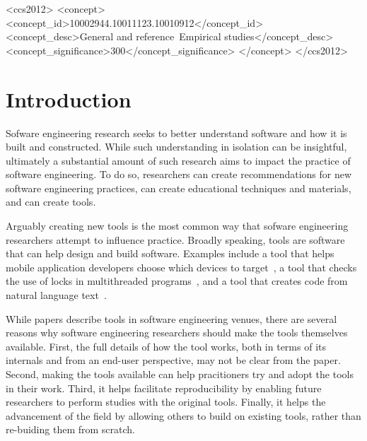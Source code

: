 \documentclass{sig-alternate-05-2015}
\begin{document}
%
\begin{CCSXML}
<ccs2012>
<concept>
<concept_id>10002944.10011123.10010912</concept_id>
<concept_desc>General and reference~Empirical studies</concept_desc>
<concept_significance>300</concept_significance>
</concept>
</ccs2012>
\end{CCSXML}


\printccsdesc


\section{Introduction}

Sofware engineering research seeks to better
understand software and how it is built and constructed.
While such understanding in isolation can be insightful,
ultimately a substantial amount of such research 
aims to impact the practice of software engineering.
To do so, researchers can create recommendations
for new software engineering practices, can 
create educational techniques and materials, 
and can create tools.

Arguably creating new tools is the most common
way that sofware engineering researchers
attempt to influence practice.
Broadly speaking, tools are software that can
help design and build software.
Examples include a tool that helps mobile application
developers choose which devices to target~\cite{prada},
a tool that checks the use of locks in multithreaded programs~\cite{ernst},
and a tool that creates code from natural language text~\cite{desai}.

While papers describe tools in software engineering venues,
there are several reasons why software engineering researchers 
should make the tools themselves available.
First, the full details of how the tool works, both in terms of its internals
and from an end-user perspective, may not be clear from the paper.
Second, making the tools available can help pracitioners try and adopt
the tools in their work.
Third, it helps facilitate reproducibility by enabling future researchers
to perform studies with the original tools.
Finally, it helps the advancement of the field by allowing others to build on 
existing tools, rather than re-buiding them from scratch.
\end{document}
